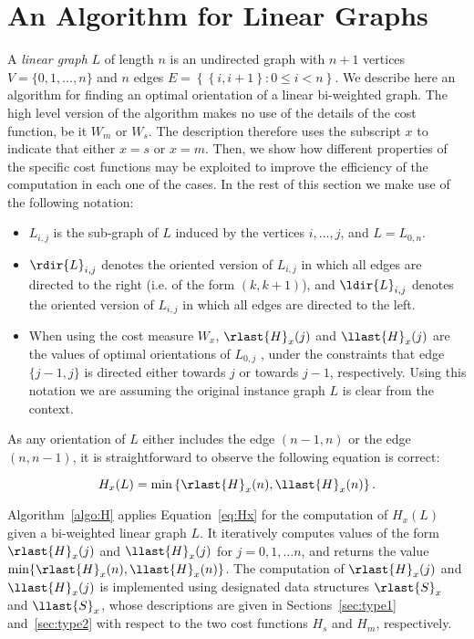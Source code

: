 
\section{An Algorithm for Linear Graphs}
\label{sec:linear}

A \emph{linear graph} $L$ of length $n$ is an undirected graph with $n+1$
vertices $V = \{0, 1, \ldots, n\}$ and $n$ edges $E = \left\{\left\{i, i+1\right\} : 0\leq i < n\right\}$. 
%
We describe here an algorithm for finding an optimal orientation 
of a linear bi-weighted graph. The high level version of the algorithm makes no use of the details
of the cost function, be it $W_m$ or $W_s$. The description therefore uses the subscript $x$ to indicate that either $x=s$ or $x=m$. Then, we show how different properties of the specific cost functions may be exploited to improve the efficiency of the computation in each one of the cases. In the rest of this section we make use of the following notation:
%
\begin{itemize}
	\item $L_{i, j}$ is the sub-graph of $L$ induced by the vertices $i,  \ldots, j$, and $L=L_{0,n}$. 
	\item $\rdir{L}_{i, j}$ denotes the oriented version 
	of $L_{i, j}$ in which all edges are directed to the right (i.e. of the form $(k, {k+1})$),	
	and $\ldir{L}_{i, j}$ denotes the oriented version 
	of $L_{i, j}$ in which all edges are directed to the left.
	\item When using the cost measure $W_x$, $\rlast{H}_x(j)$ and $\llast{H}_x(j)$ are the values of optimal orientations of $L_{0, j}$ , under the constraints	that edge $\{j-1, j\}$ is directed either towards $j$ or towards $j-1$, respectively. Using this notation we are assuming the original instance graph $L$ is clear from the context.
\end{itemize}

As any orientation of $L$ either includes the edge $(n-1, n)$ or the edge $(n, n-1)$, it is straightforward to observe the following equation is correct:

\begin{equation}
\label{eq:Hx}
H_x(L) = \min \left\{\rlast{H}_x(n), \llast{H}_x(n)\right\}.
\end{equation}

Algorithm~\ref{algo:H} applies Equation~\ref{eq:Hx} for the computation of $H_x(L)$ given a bi-weighted linear graph $L$. It iteratively computes values of the form $\rlast{H}_x(j)$ and $\llast{H}_x(j)$ for $j = 0, 1, \ldots n$, and returns the value $\min\{\rlast{H}_x(n), \llast{H}_x(n)\}$. The computation of $\rlast{H}_x(j)$ and $\llast{H}_x(j)$ is implemented using designated data structures $\rlast{S}_x$ and $\llast{S}_x$, whose descriptions are given in Sections~\ref{sec:type1} and~\ref{sec:type2} with respect to the two cost functions $H_s$ and $H_m$, respectively.

